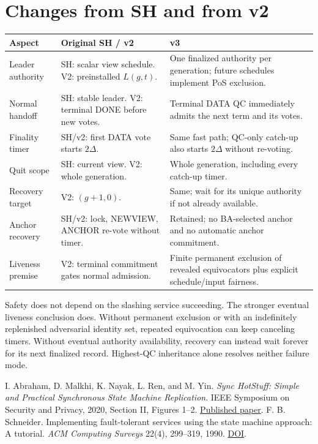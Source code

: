 \documentclass[11pt,a4paper]{article}
\begin{document}
\section{Changes from SH and from v2}
\label{sec:diff}
\begin{center}\small
\begin{tabularx}{\linewidth}{@{}p{.21\linewidth}Y Y@{}}
\toprule
Aspect & Original SH / v2 & v3\\
\midrule
Leader authority & SH: scalar view schedule. V2: preinstalled $L(g,t)$. &
One finalized authority per generation; future schedules implement
PoS exclusion.\\
Normal handoff & SH: stable leader. V2: terminal DONE before new votes. &
Terminal DATA QC immediately admits the next term and its votes.\\
Finality timer & SH/v2: first DATA vote starts $2\Delta$. &
Same fast path; QC-only catch-up also starts $2\Delta$ without re-voting.\\
Quit scope & SH: current view. V2: whole generation. &
Whole generation, including every catch-up timer.\\
Recovery target & V2: $(g+1,0)$. &
Same; wait for its unique authority if not already available.\\
Anchor recovery & SH/v2: lock, NEWVIEW, ANCHOR re-vote without timer. &
Retained; no BA-selected anchor and no automatic anchor commitment.\\
Liveness premise & V2: terminal commitment gates normal admission. &
Finite permanent exclusion of revealed equivocators plus explicit
schedule/input fairness.\\
\bottomrule
\end{tabularx}
\end{center}
Safety does not depend on the slashing service succeeding. The stronger
eventual liveness conclusion does. Without permanent exclusion or with
an indefinitely replenished adversarial identity set, repeated equivocation
can keep canceling timers. Without eventual authority availability,
recovery can instead wait forever for its next finalized record.
Highest-QC inheritance alone resolves neither failure mode.

\begin{thebibliography}{2}\small
{}
I. Abraham, D. Malkhi, K. Nayak, L. Ren, and M. Yin.
\emph{Sync HotStuff: Simple and Practical Synchronous State Machine
Replication}. IEEE Symposium on Security and Privacy, 2020, Section II,
Figures 1--2.
\href{https://conferences.computer.org/sp/pdfs/sp/2020/349700a106.pdf}{Published paper}.
F. B. Schneider. Implementing fault-tolerant services using the state
machine approach: A tutorial. \emph{ACM Computing Surveys} 22(4),
299--319, 1990. \href{https://doi.org/10.1145/98163.98167}{DOI}.
\end{thebibliography}
\end{document}
